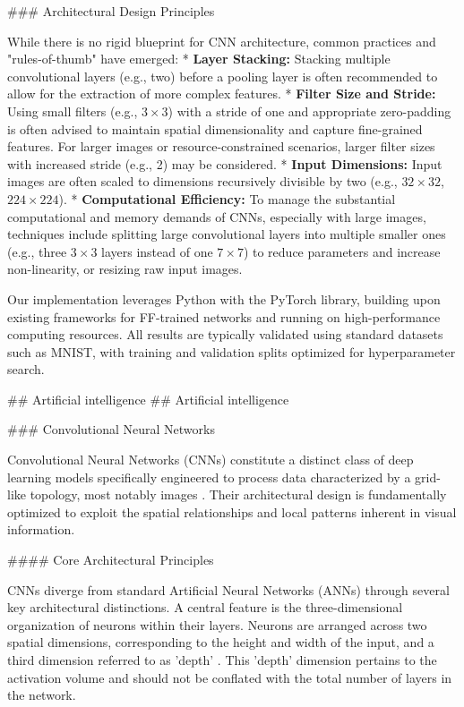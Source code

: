 \documentclass{article}
\begin{document}
\#\#\# Architectural Design Principles

While there is no rigid blueprint for CNN architecture, common practices and "rules-of-thumb" have emerged:
*   \textbf{Layer Stacking:} Stacking multiple convolutional layers (e.g., two) before a pooling layer is often recommended to allow for the extraction of more complex features.
*   \textbf{Filter Size and Stride:} Using small filters (e.g., $3 \times 3$) with a stride of one and appropriate zero-padding is often advised to maintain spatial dimensionality and capture fine-grained features. For larger images or resource-constrained scenarios, larger filter sizes with increased stride (e.g., 2) may be considered.
*   \textbf{Input Dimensions:} Input images are often scaled to dimensions recursively divisible by two (e.g., $32 \times 32$, $224 \times 224$).
*   \textbf{Computational Efficiency:} To manage the substantial computational and memory demands of CNNs, especially with large images, techniques include splitting large convolutional layers into multiple smaller ones (e.g., three $3 \times 3$ layers instead of one $7 \times 7$) to reduce parameters and increase non-linearity, or resizing raw input images.

Our implementation leverages Python with the PyTorch library, building upon existing frameworks for FF-trained networks and running on high-performance computing resources. All results are typically validated using standard datasets such as MNIST, with training and validation splits optimized for hyperparameter search.

\#\# Artificial intelligence
\#\# Artificial intelligence

\#\#\# Convolutional Neural Networks

Convolutional Neural Networks (CNNs) constitute a distinct class of deep learning models specifically engineered to process data characterized by a grid-like topology, most notably images \cite{1}. Their architectural design is fundamentally optimized to exploit the spatial relationships and local patterns inherent in visual information.

\#\#\#\# Core Architectural Principles

CNNs diverge from standard Artificial Neural Networks (ANNs) through several key architectural distinctions. A central feature is the three-dimensional organization of neurons within their layers. Neurons are arranged across two spatial dimensions, corresponding to the height and width of the input, and a third dimension referred to as 'depth' \cite{1}. This 'depth' dimension pertains to the activation volume and should not be conflated with the total number of layers in the network.
\end{document}
